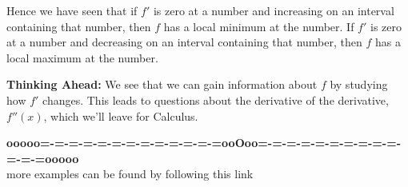 \documentclass{ximera}
\begin{document}
Hence we have seen that if $f'$ is zero at a number and increasing on an interval containing that  number,
then $f$ has a local minimum at the number. If $f'$ is zero at a number and
decreasing on an interval containing that number, then $f$ has a local maximum at the
number. 



\textbf{\textcolor{blue!55!black}{Thinking Ahead:}} We see that we can gain information about $f$ by
studying how $f'$ changes. This leads to questions about the derivative of the derivative, $f''(x)$, which we'll leave for Calculus.









\begin{center}
\textbf{\textcolor{green!50!black}{ooooo=-=-=-=-=-=-=-=-=-=-=-=-=ooOoo=-=-=-=-=-=-=-=-=-=-=-=-=ooooo}} \\

more examples can be found by following this link\\ 

\end{center}
\end{document}
